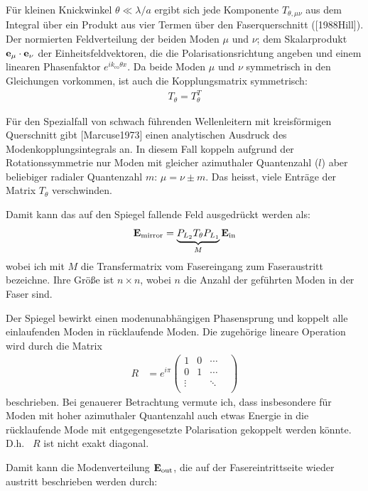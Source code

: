 \documentclass{article}
\begin{document}
F\"ur kleinen Knickwinkel $\theta \ll \lambda/a$ ergibt sich jede
Komponente $T_{\theta,\mu\nu}$ aus dem Integral \"uber ein Produkt aus
vier Termen \"uber den Faserquerschnitt ([1988Hill]). Der normierten
Feldverteilung der beiden Moden $\mu$ und $\nu$; dem Skalarprodukt
${\bf e_\mu\cdot e_\nu}$ der Einheitsfeldvektoren, die die
Polarisationsrichtung angeben und einem linearen Phasenfaktor
$e^{ik_\textrm{co}\theta x}$. Da beide Moden $\mu$ und $\nu$
symmetrisch in den Gleichungen vorkommen, ist auch die Kopplungsmatrix
symmetrisch:
\begin{align}
  T_\theta=T_\theta^T  
\end{align}


F\"ur den Spezialfall von schwach f\"uhrenden Wellenleitern mit
kreisf\"ormigen Querschnitt gibt [Marcuse1973] einen analytischen
Ausdruck des Modenkopplungsintegrals an. In diesem Fall koppeln
aufgrund der Rotationssymmetrie nur Moden mit gleicher azimuthaler
Quantenzahl ($l$) aber beliebiger radialer Quantenzahl $m$:
$\mu=\nu\pm m$. Das heisst, viele Entr\"age der Matrix $T_\theta$
verschwinden.

Damit kann das auf den Spiegel fallende Feld ausgedr\"uckt werden als:
\begin{align}
  {\bf E_\textrm{mirror}}= \underbrace{P_{L_2} T_\theta P_{L_1}}_M {\bf E_\textrm{in}} 
\end{align}
wobei ich mit $M$ die Transfermatrix vom Fasereingang zum
Faseraustritt bezeichne. Ihre Gr\"o\ss e ist $n\times n$, wobei $n$ die
Anzahl der gef\"uhrten Moden in der Faser sind.

Der Spiegel bewirkt einen modenunabh\"angigen Phasensprung und koppelt
alle einlaufenden Moden in r\"ucklaufende Moden. Die zugeh\"orige
lineare Operation wird durch die Matrix 
\begin{align}
  R&=e^{i\pi}
  \begin{pmatrix}
    1 & 0 & \cdots  \\
  0 & 1 & \cdots  \\
  \vdots            &  & \ddots &   \\
 \end{pmatrix}
\end{align}
beschrieben. Bei genauerer Betrachtung vermute ich, dass insbesondere
f\"ur Moden mit hoher azimuthaler Quantenzahl auch etwas Energie in
die r\"ucklaufende Mode mit entgegengesetzte Polarisation gekoppelt
werden k\"onnte. D.h.~ $R$ ist nicht exakt diagonal.

Damit kann die Modenverteilung ${\bf E_\textrm{out}}$, die auf der
Fasereintrittseite wieder austritt beschrieben werden durch:
\end{document}
